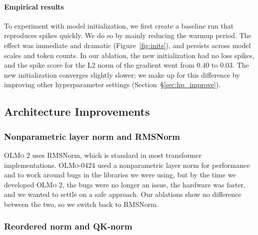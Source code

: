 \documentclass[table]{ai2style/ai2}
\newcommand{\olmoapril}{\textsc{OLMo-0424}\xspace}
\newcommand{\olmotoo}{\textsc{OLMo 2}\xspace}
\begin{document}
\paragraph{Empirical results}
To experiment with model initialization, we first create a baseline run that reproduces spikes quickly.
We do so by mainly reducing the warmup period.
The effect was immediate and dramatic (Figure~\ref{fig:inits}), and persists across model scales and token counts.
In our ablation, the new initialization had no loss spikes, and the spike score for the L2 norm of the gradient went from $0.40$ to $0.03$.
The new initialization converges slightly slower; 
we make up for this difference by improving other hyperparameter settings (Section~\S\ref{sec:hp_improve}).

\subsection{Architecture Improvements}

\subsubsection{Nonparametric layer norm and RMSNorm}

\olmotoo uses RMSNorm, which is standard in most transformer implementations.
\olmoapril used a nonparametric layer norm for performance and to work around bugs in the libraries we were using, but by the time we developed \olmotoo, the bugs were no longer an issue, the hardware was faster, and we wanted to settle on a safe approach.
Our ablations show no difference between the two, so we switch back to RMSNorm.

\subsubsection{Reordered norm and QK-norm}
\label{sec:qknorm}
\end{document}
